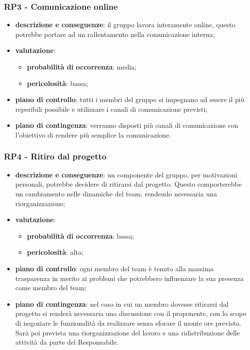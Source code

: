     \subsubsection{RP3 - Comunicazione online} \label{sec:RP3}
        \begin{itemize}
            \item \textbf{descrizione e conseguenze}: il gruppo lavora interamente online, questo potrebbe portare ad un rallentamento nella comunicazione interna;
            \item \textbf{valutazione}:
            \begin{itemize} 
                \item \textbf{probabilità di occorrenza}: media;
                \item \textbf{pericolosità}: bassa;
            \end{itemize}
            \item \textbf{piano di controllo}: tutti i membri del gruppo si impegnano ad essere il più reperibili possibile e utilizzare i canali di comunicazione previsti;
            \item \textbf{piano di contingenza}: verranno disposti più canali di comunicazione con l'obiettivo di rendere più semplice la comunicazione.
        \end{itemize}

    \subsubsection{RP4 - Ritiro dal progetto} \label{sec:RP4}
        \begin{itemize}
            \item \textbf{descrizione e conseguenze}: un componente del gruppo, per motivazioni personali, potrebbe decidere di ritirarsi dal progetto. Questo comporterebbe un cambiamento nelle dinamiche del team, rendendo necessaria una riorganizzazione;
            \item \textbf{valutazione}:
            \begin{itemize} 
                \item \textbf{probabilità di occorrenza}: bassa;
                \item \textbf{pericolosità}: alta;
            \end{itemize}
            \item \textbf{piano di controllo}: ogni membro del team è tenuto alla massima trasparenza in merito ai problemi che potrebbero influenzare la sua presenza come membro del team;
            \item \textbf{piano di contingenza}: nel caso in cui un membro dovesse ritirarsi dal progetto si renderà necessaria una discussione con il proponente, con lo scopo di negoziare le funzionalità da realizzare senza sforare il monte ore previsto. Sarà poi prevista una riorganizzazione del lavoro e una ridistribuzione delle attività da parte del Responsabile.
        \end{itemize}
                    

